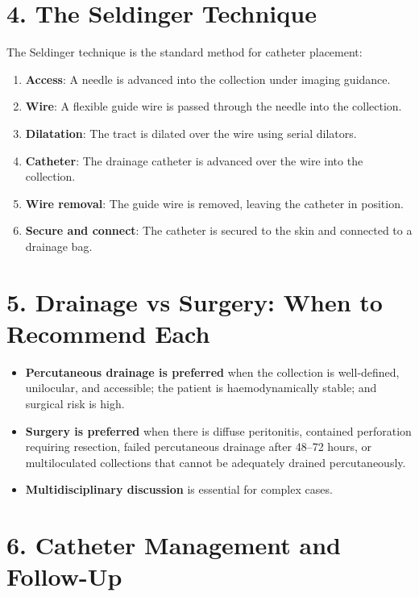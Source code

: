 \section{4. The Seldinger Technique}

The Seldinger technique is the standard method for catheter placement:

\begin{enumerate}
  \item \textbf{Access}: A needle is advanced into the collection under imaging guidance.
  \item \textbf{Wire}: A flexible guide wire is passed through the needle into the collection.
  \item \textbf{Dilatation}: The tract is dilated over the wire using serial dilators.
  \item \textbf{Catheter}: The drainage catheter is advanced over the wire into the collection.
  \item \textbf{Wire removal}: The guide wire is removed, leaving the catheter in position.
  \item \textbf{Secure and connect}: The catheter is secured to the skin and connected to a drainage bag.
\end{enumerate}


\section{5. Drainage vs Surgery: When to Recommend Each}

\begin{itemize}
  \item \textbf{Percutaneous drainage is preferred} when the collection is well-defined, unilocular, and accessible; the patient is haemodynamically stable; and surgical risk is high.
  \item \textbf{Surgery is preferred} when there is diffuse peritonitis, contained perforation requiring resection, failed percutaneous drainage after 48--72 hours, or multiloculated collections that cannot be adequately drained percutaneously.
  \item \textbf{Multidisciplinary discussion} is essential for complex cases.
\end{itemize}

\section{6. Catheter Management and Follow-Up}

